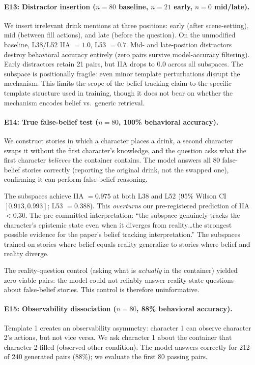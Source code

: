 \documentclass[11pt]{article}
\begin{document}
\paragraph{E13: Distractor insertion ($n = 80$ baseline, $n = 21$ early, $n = 0$ mid/late).}
We insert irrelevant drink mentions at three positions: early (after scene-setting), mid (between fill actions), and late (before the question). On the unmodified baseline, L38/L52 IIA $= 1.0$, L53 $= 0.7$. Mid- and late-position distractors destroy behavioral accuracy entirely (zero pairs survive model-accuracy filtering). Early distractors retain 21 pairs, but IIA drops to $0.0$ across all subspaces. The subspace is positionally fragile: even minor template perturbations disrupt the mechanism. This limits the scope of the belief-tracking claim to the specific template structure used in training, though it does not bear on whether the mechanism encodes belief vs.\ generic retrieval.

\paragraph{E14: True false-belief test ($n = 80$, 100\% behavioral accuracy).}
We construct stories in which a character places a drink, a second character swaps it without the first character's knowledge, and the question asks what the first character \emph{believes} the container contains. The model answers all 80 false-belief stories correctly (reporting the original drink, not the swapped one), confirming it can perform false-belief reasoning.

The subspaces achieve IIA $= 0.975$ at both L38 and L52 (95\% Wilson CI $[0.913, 0.993]$; L53 $= 0.388$). This \emph{overturns} our pre-registered prediction of IIA $< 0.30$. The pre-committed interpretation: ``the subspace genuinely tracks the character's epistemic state even when it diverges from reality\ldots the strongest possible evidence for the paper's belief tracking interpretation.'' The subspaces trained on stories where belief equals reality generalize to stories where belief and reality diverge.

The reality-question control (asking what is \emph{actually} in the container) yielded zero viable pairs: the model could not reliably answer reality-state questions about false-belief stories. This control is therefore uninformative.

\paragraph{E15: Observability dissociation ($n = 80$, 88\% behavioral accuracy).}
Template 1 creates an observability asymmetry: character 1 can observe character 2's actions, but not vice versa. We ask character 1 about the container that character 2 filled (observed-other condition). The model answers correctly for 212 of 240 generated pairs (88\%); we evaluate the first 80 passing pairs.
\end{document}
